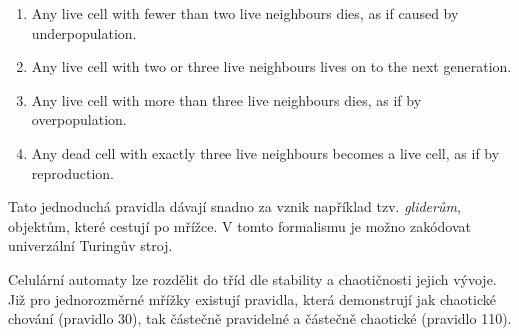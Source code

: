 \begin{enumerate}
    \item Any live cell with fewer than two live neighbours dies, as if caused by underpopulation.
    \item Any live cell with two or three live neighbours lives on to the next generation.
    \item Any live cell with more than three live neighbours dies, as if by overpopulation.
    \item Any dead cell with exactly three live neighbours becomes a live cell, as if by reproduction.
\end{enumerate}

Tato jednoduchá pravidla dávají snadno za vznik například tzv. {\em
gliderům}, objektům, které cestují po mřížce.
V tomto formalismu je možno zakódovat univerzální Turingův stroj.

Celulární automaty lze rozdělit do tříd dle stability a
chaotičnosti jejich vývoje. Již pro jednorozměrné
mřížky existují pravidla, která demonstrují jak chaotické chování
(pravidlo 30), tak částečně pravidelné a částečně chaotické (pravidlo
110).

